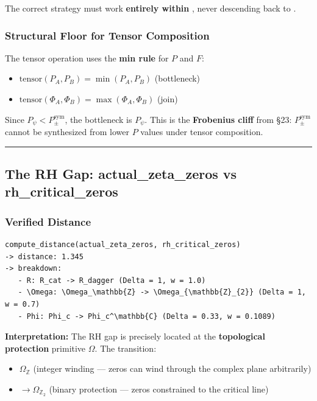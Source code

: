 \documentclass[12pt,a4paper]{article}
\newcommand{\pilcrow}{\S}
\begin{document}
The correct strategy must work \textbf{entirely within \xi}, never descending back to \zeta.

\subsubsection{Structural Floor for Tensor Composition}

The tensor operation uses the \textbf{min rule} for $P$ and $F$:

\begin{itemize}
    \item $\text{tensor}(P_A, P_B) = \min(P_A, P_B)$ (bottleneck)
    \item $\text{tensor}(\Phi_A, \Phi_B) = \max(\Phi_A, \Phi_B)$ (join)
\end{itemize}

Since $P_{\psi} < P_{\pm}^{\text{sym}}$, the bottleneck is $P_{\psi}$. This is the \textbf{Frobenius cliff} from \pilcrow{}23: $P_{\pm}^{\text{sym}}$ cannot be synthesized from lower $P$ values under tensor composition.

\begin{center}
\rule{0.5\textwidth}{0.4pt}
\end{center}

\subsection{The RH Gap: actual\_zeta\_zeros vs rh\_critical\_zeros}

\subsubsection{Verified Distance}

\begin{lstlisting}
compute_distance(actual_zeta_zeros, rh_critical_zeros)
-> distance: 1.345
-> breakdown:
   - R: R_cat -> R_dagger (Delta = 1, w = 1.0)
   - \Omega: \Omega_\mathbb{Z} -> \Omega_{\mathbb{Z}_{2}} (Delta = 1, w = 0.7)
   - Phi: Phi_c -> Phi_c^\mathbb{C} (Delta = 0.33, w = 0.1089)
\end{lstlisting}

\textbf{Interpretation:} The RH gap is precisely located at the \textbf{topological protection} primitive $\Omega$. The transition:

\begin{itemize}
    \item $\Omega_\mathbb{Z}$ (integer winding --- zeros can wind through the complex plane arbitrarily)
    \item $\to \Omega_{\mathbb{Z}_2}$ (binary protection --- zeros constrained to the critical line)
\end{itemize}
\end{document}
